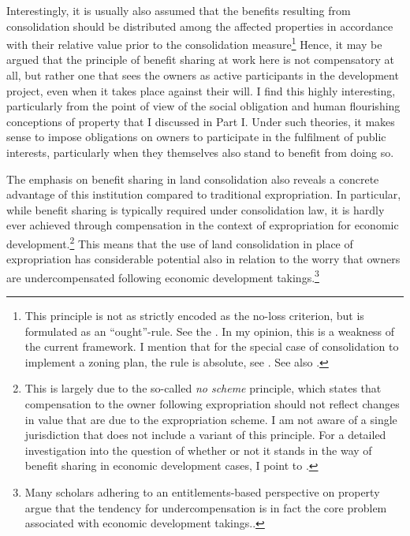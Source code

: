 Interestingly, it is usually also assumed that the benefits resulting from consolidation should be distributed among the affected properties in accordance with their relative value prior to the consolidation measure\footnote{This principle is not as strictly encoded as the no-loss criterion, but is formulated as an ``ought''-rule. See the \cite[31|41]{lca79}. In my opinion, this is a weakness of the current framework. I mention that for the special case of consolidation to implement a zoning plan, the rule is absolute, see \cite[3 b)]{lca79}. See also \cite{hauge15}.} Hence, it may be argued that the principle of benefit sharing at work here is not compensatory at all, but rather one that sees the owners as active participants in the development project, even when it takes place against their will. I find this highly interesting, particularly from the point of view of the social obligation and human flourishing conceptions of property that I discussed in Part I. Under such theories, it makes sense to impose obligations on owners to participate in the fulfilment of public interests, particularly when they themselves also stand to benefit from doing so.

The emphasis on benefit sharing in land consolidation also reveals a concrete advantage of this institution compared to traditional expropriation. In particular, while benefit sharing is typically required under consolidation law, it is hardly ever achieved through compensation in the context of expropriation for economic development.\footnote{This is largely due to the so-called {\it no scheme} principle, which states that compensation to the owner following expropriation should not reflect changes in value that are due to the expropriation scheme. I am not aware of a single jurisdiction that does not include a variant of this principle. For a detailed investigation into the question of whether or not it stands in the way of benefit sharing in economic development cases, I point to \cite{dyrkolbotn15}.} This means that the use of land consolidation in place of expropriation has considerable potential also in relation to the worry that owners are undercompensated following economic development takings.\footnote{Many scholars adhering to an entitlements-based perspective on property argue that the tendency for undercompensation is in fact the core problem associated with economic development takings.\cite{fennel04,lehavi07,bell07}.}

